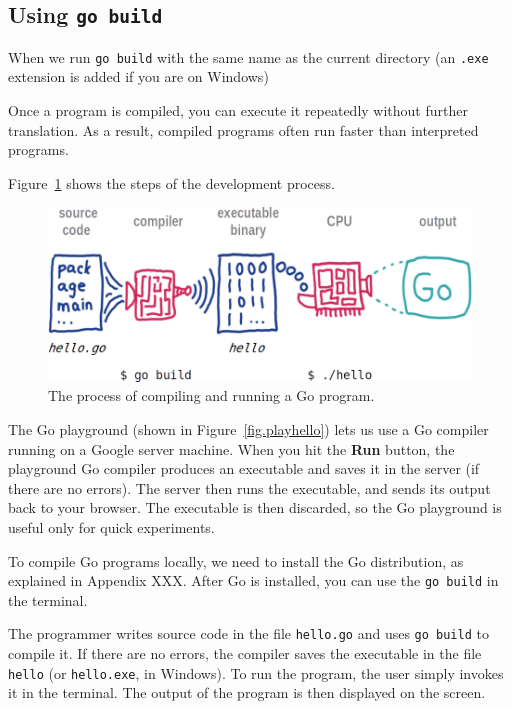 \subsection{Using \tt{go build}}


When we run {\tt go build}  with the same name as the current directory
(an {\tt .exe} extension is added if you are on Windows)


Once a program is compiled, you can execute it repeatedly without further translation.
As a result, compiled programs often run faster than interpreted programs.

Figure~\ref{fig.compiler} shows the steps of the development process.

\begin{figure}[!ht]
\begin{center}
\includegraphics{figs/compiler.png}
\caption{The process of compiling and running a Go program.}
\label{fig.compiler}
\end{center}
\end{figure}

The Go playground (shown in Figure~\ref{fig.playhello}) lets us use a Go compiler running on a Google server machine.
When you hit the {\bf Run} button, the playground Go compiler produces an executable and saves it in the server (if there are no errors).
The server then runs the executable, and sends its output back to your browser.
The executable is then discarded, so the Go playground is useful only for quick experiments.

To compile Go programs locally, we need to install the Go distribution, as explained in Appendix XXX. After Go is installed, you can use the {\tt go build} in the terminal.


The programmer writes source code in the file {\tt hello.go} and uses {\tt go build} to compile it.
If there are no errors, the compiler saves the executable in the file {\tt hello} (or {\tt hello.exe}, in Windows).
To run the program, the user simply invokes it in the terminal.
The output of the program is then displayed on the screen.

